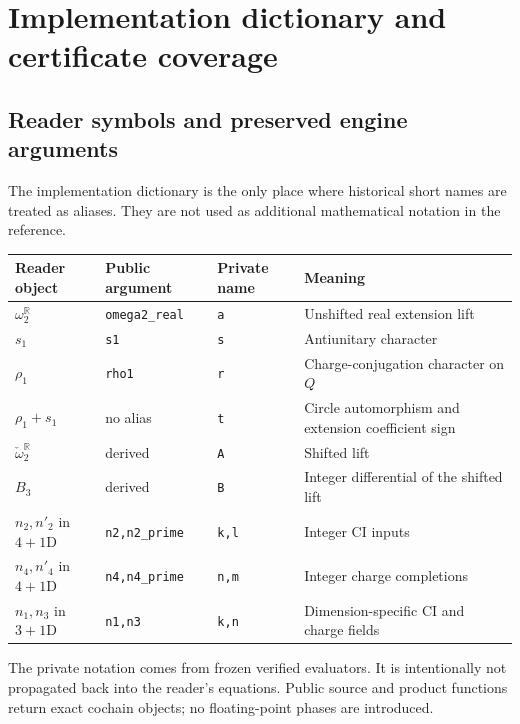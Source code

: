 \section{Implementation dictionary and certificate coverage}\label{app:implementation}
\subsection{Reader symbols and preserved engine arguments}
The implementation dictionary is the only place where historical short names are treated as aliases. They are not used as additional mathematical notation in the reference.
\begin{center}
\begin{tabularx}{\textwidth}{@{}lllX@{}}\toprule
Reader object & Public argument & Private name & Meaning\\\midrule
$\omega_2^{\mathbb R}$ & \texttt{omega2\_real} & \texttt{a} & Unshifted real extension lift\\
$s_1$ & \texttt{s1} & \texttt{s} & Antiunitary character\\
$\rho_1$ & \texttt{rho1} & \texttt{r} & Charge-conjugation character on $Q$\\
$\rho_1+s_1$ & no alias & \texttt{t} & Circle automorphism and extension coefficient sign\\
$\check\omega_2^{\mathbb R}$ & derived & \texttt{A} & Shifted lift\\
$B_3$ & derived & \texttt{B} & Integer differential of the shifted lift\\
$n_2,n'_2$ in $4+1$D & \texttt{n2,n2\_prime} & \texttt{k,l} & Integer CI inputs\\
$n_4,n'_4$ in $4+1$D & \texttt{n4,n4\_prime} & \texttt{n,m} & Integer charge completions\\
$n_1,n_3$ in $3+1$D & \texttt{n1,n3} & \texttt{k,n} & Dimension-specific CI and charge fields\\\bottomrule
\end{tabularx}
\end{center}
The private notation comes from frozen verified evaluators. It is intentionally not propagated back into the reader's equations. Public source and product functions return exact cochain objects; no floating-point phases are introduced.

